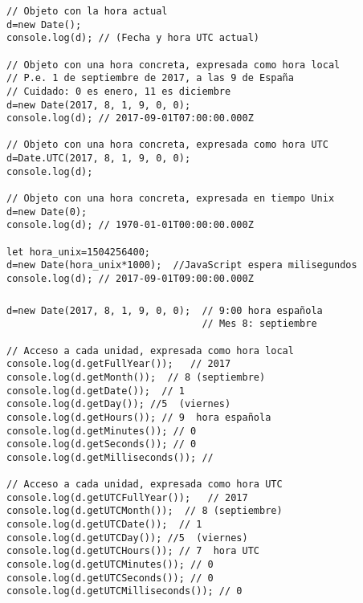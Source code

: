 \documentclass[ucs]{beamer}
\begin{document}
\begin{frame}[fragile]
\frametitle{}

  \begin{scriptsize}
  \begin{verbatim}
// Objeto con la hora actual
d=new Date();
console.log(d); // (Fecha y hora UTC actual)

// Objeto con una hora concreta, expresada como hora local
// P.e. 1 de septiembre de 2017, a las 9 de España
// Cuidado: 0 es enero, 11 es diciembre
d=new Date(2017, 8, 1, 9, 0, 0);
console.log(d); // 2017-09-01T07:00:00.000Z

// Objeto con una hora concreta, expresada como hora UTC
d=Date.UTC(2017, 8, 1, 9, 0, 0);
console.log(d);

// Objeto con una hora concreta, expresada en tiempo Unix
d=new Date(0);
console.log(d); // 1970-01-01T00:00:00.000Z

let hora_unix=1504256400;
d=new Date(hora_unix*1000);  //JavaScript espera milisegundos
console.log(d); // 2017-09-01T09:00:00.000Z
  \end{verbatim}
  \end{scriptsize}

\end{frame}


\begin{frame}[fragile]
\frametitle{}
  \begin{scriptsize}
  \begin{verbatim}
d=new Date(2017, 8, 1, 9, 0, 0);  // 9:00 hora española
                                  // Mes 8: septiembre

// Acceso a cada unidad, expresada como hora local
console.log(d.getFullYear());   // 2017
console.log(d.getMonth());  // 8 (septiembre)
console.log(d.getDate());  // 1
console.log(d.getDay()); //5  (viernes)
console.log(d.getHours()); // 9  hora española 
console.log(d.getMinutes()); // 0
console.log(d.getSeconds()); // 0 
console.log(d.getMilliseconds()); // 

// Acceso a cada unidad, expresada como hora UTC
console.log(d.getUTCFullYear());   // 2017
console.log(d.getUTCMonth());  // 8 (septiembre)
console.log(d.getUTCDate());  // 1
console.log(d.getUTCDay()); //5  (viernes)
console.log(d.getUTCHours()); // 7  hora UTC
console.log(d.getUTCMinutes()); // 0
console.log(d.getUTCSeconds()); // 0 
console.log(d.getUTCMilliseconds()); // 0
  \end{verbatim}
  \end{scriptsize}

\end{frame}
\end{document}
